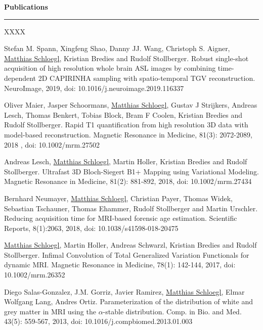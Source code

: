 
\vspace{0.7cm}
{\bf Publications}\\
\noindent\rule{\textwidth}{0.5pt}
\renewcommand{\refname}{\normalsize Fullpaper}

\begin{thebibliography}{XXXX}

	\newblock Stefan M. Spann, Xingfeng Shao, Danny JJ. Wang, Christoph S. Aigner, \underline{Matthias Schloegl}, Kristian Bredies and Rudolf Stollberger.
	\newblock Robust single-shot acquisition of high resolution whole brain ASL images by combining time-dependent 2D CAPIRINHA sampling with spatio-temporal TGV reconstruction.
	\newblock NeuroImage, 2019, doi: 10.1016/j.neuroimage.2019.116337

	\newblock Oliver Maier, Jasper Schoormans, \underline{Matthias Schloegl}, Gustav J Strijkers, Andreas Lesch, Thomas Benkert, Tobias Block, Bram F Coolen, Kristian Bredies and Rudolf Stollberger. 
	\newblock Rapid T1 quantification from high resolution 3D data with model-based reconstruction.
	\newblock Magnetic Resonance in Medicine, 81(3): 2072-2089, 2018 , doi: 10.1002/mrm.27502

	\newblock Andreas Lesch, \underline{Matthias Schloegl}, Martin Holler, Kristian Bredies and Rudolf Stollberger. 
	\newblock Ultrafast 3D Bloch-Siegert B1+ Mapping using Variational Modeling.
	\newblock Magnetic Resonance in Medicine, 81(2): 881-892, 2018, doi: 10.1002/mrm.27434

 	\newblock Bernhard Neumayer, \underline{Matthias Schloegl}, Christian Payer, Thomas Widek, Sebastian Tschauner, Thomas Ehammer, Rudolf Stollberger and Martin Urschler.
 	\newblock Reducing acquisition time for MRI-based forensic age estimation. 
 	\newblock Scientific Reports, 8(1):2063, 2018, doi: 10.1038/s41598-018-20475

 	\newblock \underline{Matthias Schloegl}, Martin Holler, Andreas Schwarzl, Kristian Bredies and Rudolf Stollberger. 
 	\newblock Infimal Convolution of Total Generalized Variation Functionals for dynamic MRI.
 	\newblock Magnetic Resonance in Medicine, 78(1): 142-144, 2017, doi: 10.1002/mrm.26352
 
  	\newblock Diego Salas-Gonzalez, J.M. Gorriz, Javier Ramirez, \underline{Matthias Schloegl}, Elmar Wolfgang Lang, Andres Ortiz.
  	\newblock Parameterization of the distribution of white and grey matter in MRI using the $ \alpha$-stable distribution.
  	\newblock Comp. in Bio. and Med. 43(5): 559-567, 2013, doi: 10.1016/j.compbiomed.2013.01.003
  
\end{thebibliography}

